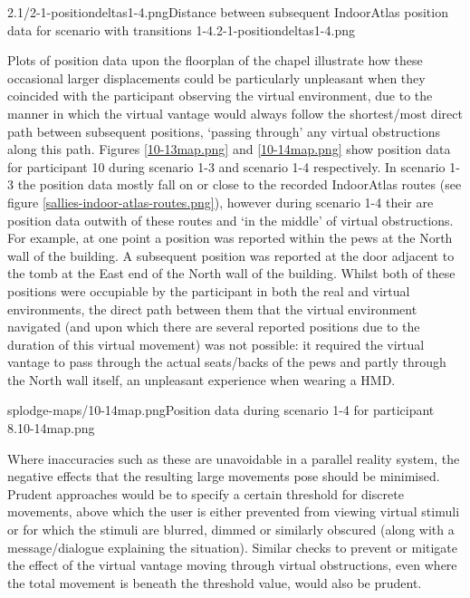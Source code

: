        {2.1/2-1-positiondeltas1-4.png}{Distance between subsequent IndoorAtlas position data for scenario with transitions 1-4.}{2-1-positiondeltas1-4.png}
       
Plots of position data upon the floorplan of the chapel illustrate how these occasional larger displacements could be particularly unpleasant when they coincided with the participant observing the virtual environment, due to the manner in which the virtual vantage would always follow the shortest/most direct path between subsequent positions, `passing through' any virtual obstructions along this path. Figures \ref{10-13map.png} and \ref{10-14map.png} show position data for participant 10 during scenario 1-3 and scenario 1-4 respectively. In scenario 1-3 the position data mostly fall on or close to the recorded IndoorAtlas routes (see figure \ref{sallies-indoor-atlas-routes.png}), however during scenario 1-4 their are position data outwith of these routes and `in the middle' of virtual obstructions. For example, at one point a position was reported within the pews at the North wall of the building. A subsequent position was reported at the door adjacent to the tomb at the East end of the North wall of the building. Whilst both of these positions were occupiable by the participant in both the real and virtual environments, the direct path between them that the virtual environment navigated (and upon which there are several reported positions due to the duration of this virtual movement) was not possible: it required the virtual vantage to pass through the actual seats/backs of the pews and partly through the North wall itself, an unpleasant experience when wearing a HMD.

       {splodge-maps/10-14map.png}{Position data during scenario 1-4 for participant 8.}{10-14map.png}

Where inaccuracies such as these are unavoidable in a parallel reality system, the negative effects that the resulting large movements pose should be minimised. Prudent approaches would be to specify a certain threshold for discrete movements, above which the user is either prevented from viewing virtual stimuli or for which the stimuli are blurred, dimmed or similarly obscured (along with a message/dialogue explaining the situation). Similar checks to prevent or mitigate the effect of the virtual vantage moving through virtual obstructions, even where the total movement is beneath the threshold value, would also be prudent.

